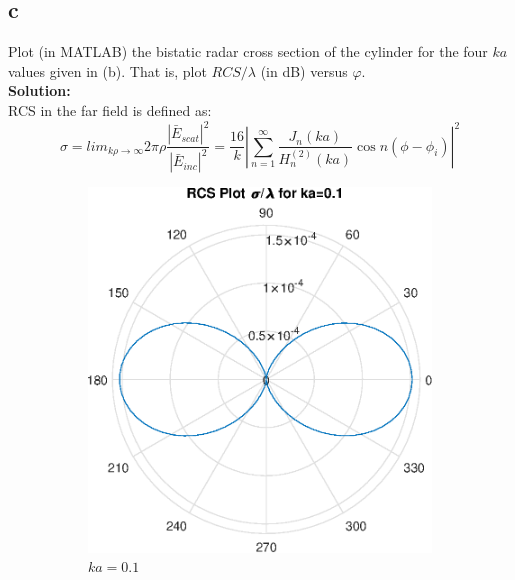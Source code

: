 \documentclass[11pt]{amsart}
\begin{document}
\subsection*{c}
Plot (in MATLAB) the bistatic radar cross section of the cylinder for the four $ka$ values given in (b). That is, plot $RCS/\lambda$ (in dB) versus $\varphi$.
\\
\textbf{Solution:}\\
RCS in the far field is defined as: 
\begin{equation}
\label{eq:9}
\sigma = lim_{k\rho \rightarrow \infty} 2\pi \rho \frac{\left | \bar{E}_{scat}  \right |^2}{\left | \bar{E}_{inc} \right |^2}=\frac{16}{k}\left |\sum_{n=1}^{\infty} \frac{J_n(ka)}{H^{(2)}_n(ka)} \cos n(\phi-\phi_i) \right |^2
\end{equation}
\begin{figure}[!h]
    \centering
    \begin{subfigure}[b]{0.45\textwidth}
        \includegraphics[width=\textwidth]{RCSka01}
        \caption{$ka=0.1$}
        \label{fig:gull}
    \end{subfigure}
    ~ %
    \begin{subfigure}[b]{0.45\textwidth}

\end{subfigure}
\end{figure}
\end{document}

